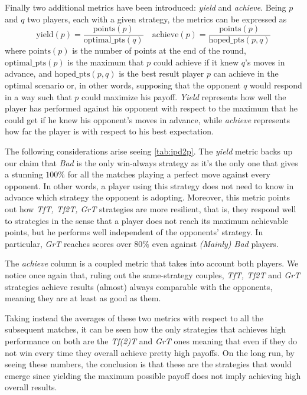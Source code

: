 \documentclass[journal,10pt,twoside]{IEEEtran}
\begin{document}
Finally two additional metrics have been introduced: \textit{yield} and \textit{achieve}. 
Being $p$ and $q$ two players, each with a given strategy, the metrics can be expressed as
$$
\mathrm{yield}(p) = \frac{\mathrm{points}(p)}{\mathrm{optimal\_pts}(q)} \quad
\mathrm{achieve}(p) = \frac{\mathrm{points}(p)}{\mathrm{hoped\_pts}(p,q)}
$$
where $\mathrm{points}(p)$ is the number of points at the end of the round,
$\mathrm{optimal\_pts}(p)$ is the maximum that $p$ could achieve if it knew $q$'s moves in advance, and
$\mathrm{hoped\_pts}(p,q)$ is the best result player $p$ can achieve in the optimal scenario or, in other words, supposing that the opponent $q$ would respond in a way such that $p$ could maximize his payoff.
\textit{Yield} represents how well the player has performed against his opponent with respect to the maximum that he could get if he knew his opponent's moves in advance, while \textit{achieve} represents how far the player is with respect to his best expectation.

The following considerations arise seeing \autoref{tab:ipd2p}.
The \textit{yield} metric backs up our claim that \textit{Bad} is the only win-always strategy as it's the only one that gives a stunning $100\%$ for all the matches playing a perfect move against every opponent. In other words, a player using this strategy does not need to know in advance which strategy the opponent is adopting. Moreover, this metric points out how \textit{TfT, Tf2T, GrT} strategies are more resilient, that is, they respond well to strategies in the sense that a player does not reach its maximum achievable points, but he performs well independent of the opponents' strategy. In particular, \textit{GrT} reaches scores over $80\%$ even against \textit{(Mainly) Bad} players.

The \textit{achieve} column is a coupled metric that takes into account both players. We notice once again that, ruling out the same-strategy couples, \textit{TfT, Tf2T} and \textit{GrT} strategies achieve results (almost) always comparable with the opponents, meaning they are at least as good as them.

Taking instead the averages of these two metrics with respect to all the subsequent matches, it can be seen how the only strategies that achieves high performance on both are the \textit{Tf(2)T} and \textit{GrT} ones meaning that even if they do not win every time they overall achieve pretty high payoffs. %
On the long run, by seeing these numbers, the conclusion is that these are the strategies that would emerge since yielding the maximum possible payoff does not imply achieving high overall results.
\end{document}
